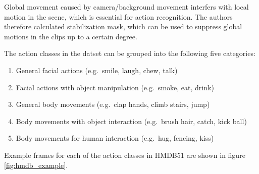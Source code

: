 Global movement caused by camera/background movement interfers with local motion in the scene, which is essential for action recognition.
The authors therefore calculated stabilization mask, which can be used to suppress global motions in the clips up to a certain degree. \cite{kuehne_hmdb:_2011}

The action classes in the datset can be grouped into the following five categories: \cite{kuehne_hmdb:_2011}
\begin{enumerate}
    \item General facial actions (e.g.\ smile, laugh, chew, talk)
    \item Facial actions with object manipulation (e.g.\ smoke, eat, drink)
    \item General body movements (e.g.\ clap hands, climb stairs, jump)
    \item Body movements with object interaction (e.g.\ brush hair, catch, kick ball)
    \item Body movements for human interaction (e.g.\ hug, fencing, kiss)
\end{enumerate}

Example frames for each of the action classes in HMDB51 are shown in figure \ref{fig:hmdb_example}.

